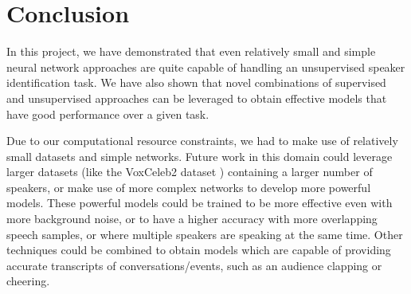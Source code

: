 \documentclass[10pt,twocolumn,letterpaper]{article}
\begin{document}
\section{Conclusion}

In this project, we have demonstrated that even relatively small and simple neural network approaches are quite capable of handling an unsupervised speaker identification task. We have also shown that novel combinations of supervised and unsupervised approaches can be leveraged to obtain effective models that have good performance over a given task.

Due to our computational resource constraints, we had to make use of relatively small datasets and simple networks. Future work in this domain could leverage larger datasets (like the VoxCeleb2 dataset \cite{base}) containing a larger number of speakers, or make use of more complex networks to develop more powerful models. These powerful models could be trained to be more effective even with more background noise, or to have a higher accuracy with more overlapping speech samples, or where multiple speakers are speaking at the same time. Other techniques could be combined to obtain models which are capable of providing accurate transcripts of conversations/events, such as an audience clapping or cheering.

\end{document}
